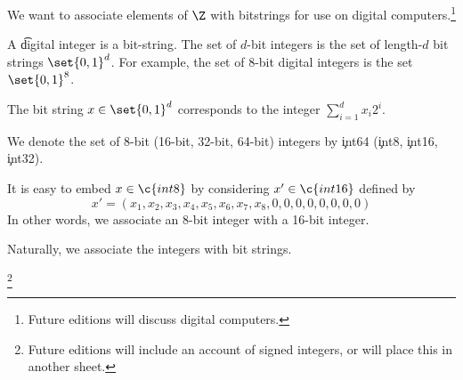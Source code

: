 

We want to associate elements of $\Z$ with bitstrings for use on digital computers.\footnote{Future editions will discuss digital computers.}


A \t{digital integer} is a bit-string.
The set of \t{$d$-bit integers} is the set of length-$d$ bit strings $\set{0, 1}^d$.
For example, the set of 8-bit digital integers is the set $\set{0, 1}^8$.


The bit string $x \in \set{0, 1}^d$ corresponds to the integer $\sum_{i = 1}^{d} x_i 2^i$.


We denote the set of 8-bit (16-bit, 32-bit, 64-bit) integers by \c{int64} (\c{int8}, \c{int16}, \c{int32}).

It is easy to embed $x \in \c{int8}$ by considering $x' \in \c{int16}$ defined by
\[
  x' = (x_1, x_2, x_3, x_4, x_5, x_6, x_7, x_8, 0, 0, 0, 0, 0, 0, 0, 0)
\]
In other words, we associate an 8-bit integer with a 16-bit integer.

Naturally, we associate the integers with bit strings.

\footnote{Future editions will include an account of signed integers, or will place this in another sheet.}

\blankpage
